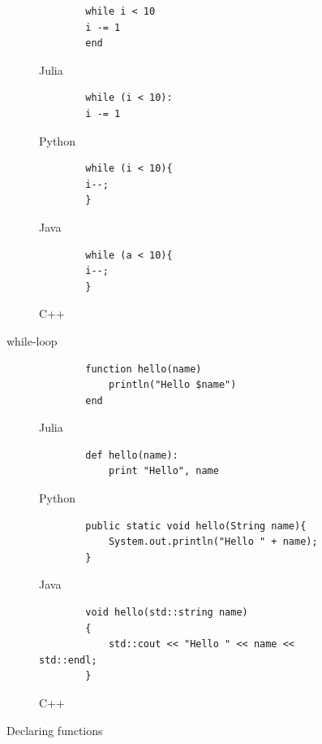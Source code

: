 \documentclass[a4paper, 11pt, titlepage]{article}
\begin{document}
\begin{figure}[H]
	\centering
	\begin{subfigure}[b]{0.7\textwidth}
		\centering
		\begin{lstlisting}
		while i < 10
		i -= 1
		end
		\end{lstlisting}
		\caption{Julia}
	\end{subfigure}
	\begin{subfigure}[b]{0.7\textwidth}
		\centering
		\begin{lstlisting}
		while (i < 10):
		i -= 1
		\end{lstlisting}
		\caption{Python}
	\end{subfigure}	
	\begin{subfigure}[b]{0.7\textwidth}
		\centering
		\begin{lstlisting}
		while (i < 10){
		i--;
		}
		\end{lstlisting}
		\caption{Java}
	\end{subfigure}
	\begin{subfigure}[b]{0.7\textwidth}
		\centering
		\begin{lstlisting}
		while (a < 10){
		i--;
		}
		\end{lstlisting}
		\caption{C++}
	\end{subfigure}
	\caption{while-loop}
	\label{whileloop}
\end{figure}

\begin{figure}[H]
	\centering
	\begin{subfigure}[b]{0.7\textwidth}
		\centering
		\begin{lstlisting}
		function hello(name)
			println("Hello $name")
		end
		\end{lstlisting}
		\caption{Julia}
	\end{subfigure}
	\begin{subfigure}[b]{0.7\textwidth}
		\centering
		\begin{lstlisting}
		def hello(name):
			print "Hello", name
		\end{lstlisting}
		\caption{Python}
	\end{subfigure}	
	\begin{subfigure}[b]{0.7\textwidth}
		\centering
		\begin{lstlisting}
		public static void hello(String name){
			System.out.println("Hello " + name);
		}
		\end{lstlisting}
		\caption{Java}
	\end{subfigure}
	\begin{subfigure}[b]{0.7\textwidth}
		\centering
		\begin{lstlisting}
		void hello(std::string name)
		{
			std::cout << "Hello " << name << std::endl;
		}
		\end{lstlisting}
		\caption{C++}
	\end{subfigure}
	\caption{Declaring functions}
	\label{function}
\end{figure}
\end{document}
